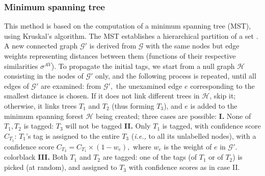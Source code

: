 \subsubsection{Minimum spanning tree}
This method is based on the computation of a minimum spanning tree (MST), using Kruskal's algorithm. The MST establishes a hierarchical partition of a set \cite{perret2015}. A new connected graph $\mathcal{G'}$ is derived from $\mathcal{G}$ with the same nodes but edge weights representing distances between them (functions of their respective similarities $\sigma^{AV}$). To propagate the initial tags, we start from a null graph $\mathcal{H}$ consisting in the nodes of $\mathcal{G'}$ only, and the following process is repeated, until all edges of $\mathcal{G'}$ are examined: from $\mathcal{G'},$ the unexamined edge $e$ corresponding to the smallest distance is chosen. If it does not link different trees in \color{black}$\mathcal{H}$\color{black},  skip it; otherwise, it links trees $T_1$ and $T_2$ (thus forming  $T_3$), and $e$ is added to the minimum spanning forest $\mathcal{H}$ being created; three cases are possible: 
\textbf{I.}  None of $T_1, T_2$ is tagged: $T_3$ will not be tagged \textbf{II. } Only $T_1$ is tagged, with confidence score $C_{T_1}$: $T_1$'s tag is assigned to the entire  $T_3$ (\textit{i.e.,} to all its unlabelled nodes), with a confidence score $C_{T_3} = C_{T_1}\times(1-w_e), $ where $w_e$ is the weight of $e$ \color{black} in $\mathcal{G'}$. color{black} \textbf{III. } Both $T_1$ and $T_2$ are tagged: one of the tags (of $T_1$ or of $T_2$) is picked (at random), and assigned to  $T_3$ with confidence scores as in case II. 


\endinput
